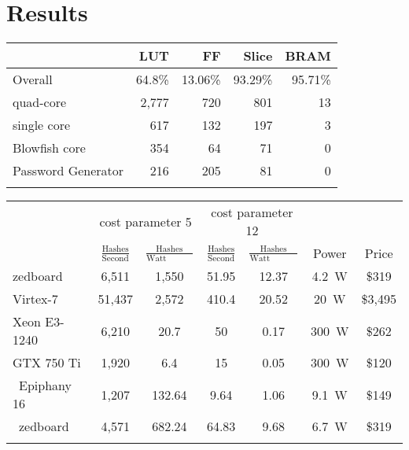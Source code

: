 
\section{Results}
\label{sec:results}

\begin{table*}[tp] \centering
	\begin{minipage}[b]{0.35\textwidth} \centering
		\caption{Resource utilization of design and submodules.}
		\label{tab:results_resource_utilization}
		\begin{tabular}{l r r r r}
			\toprule
							   &    LUT    &    FF     &   Slice   &   BRAM    \\
			\midrule
			Overall            &  64.8\% & 13.06\% & 93.29\% & 95.71\% \\
			\midrule
			quad-core          &  2,777  &    720  &    801  &   13    \\
			single core        &    617  &    132  &    197  &    3    \\
			Blowfish core      &    354  &     64  &     71  &    0    \\
			Password Generator &    216  &    205  &     81  &    0    \\
			\bottomrule\\
		\end{tabular}
	\end{minipage}%
	\hspace{1.5cm}
	\begin{minipage}[b]{0.5\textwidth} \centering
		\caption{Comparison of multiple implementations and platforms, considering
		full system power consumption.}
		\label{tab:results_different_plattforms}
		\begin{tabular}{l c c c c c c}
			\toprule
			& \multicolumn{2}{c}{cost parameter 5}
			& \multicolumn{2}{c}{cost parameter 12}
			& & \\
			& $\frac{\text{Hashes}}{\text{Second}}$
			& $\frac{\text{Hashes}}{\text{Watt Second}}$
			& $\frac{\text{Hashes}}{\text{Second}}$
			& $\frac{\text{Hashes}}{\text{Watt Second}}$
			& Power & Price \\
			\midrule
			zedboard     &  6,511 & 1,550 &  51.95 & 12.37 & \SI{4.2}{\watt} &   \$319 \\
			Virtex-7     & 51,437 & 2,572 & 410.4  & 20.52 & \SI{ 20}{\watt} & \$3,495 \\
			\midrule
			Xeon E3-1240 &  6,210 &  20.7 &  50    &  0.17 & \SI{300}{\watt} &   \$262 \\
			GTX 750 Ti   &  1,920 &   6.4 &  15    &  0.05 & \SI{300}{\watt} &   \$120 \\
			\midrule
			\cite{WOOT/Malvoni14}~Epiphany 16 &  1,207 & 132.64 &  9.64 & 1.06 & \SI{9.1}{\watt} &   \$149 \\
			\cite{WOOT/Malvoni14}~zedboard    &  4,571 & 682.24 & 64.83 & 9.68 & \SI{6.7}{\watt} &   \$319 \\
			\bottomrule\\
		\end{tabular}
	\end{minipage}%
\end{table*}

